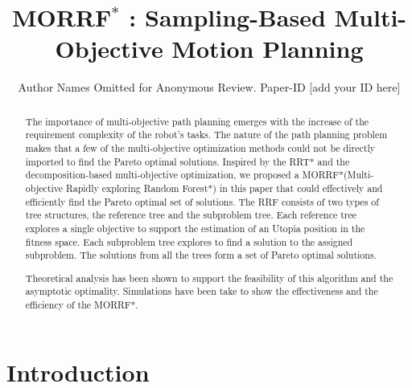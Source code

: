 \documentclass[conference]{IEEEtran}
\theoremstyle{definition}
\begin{document}
\title{ MORRF$^{*}$ : Sampling-Based Multi-Objective Motion Planning }

\author{Author Names Omitted for Anonymous Review. Paper-ID [add your ID here]}

\maketitle

\begin{abstract}
The importance of multi-objective path planning emerges with the increase of the requirement complexity of the robot's tasks.
The nature of the path planning problem makes that a few of the multi-objective optimization methods could not be directly imported to find the Pareto optimal solutions.
Inspired by the RRT* and the decomposition-based multi-objective optimization, we proposed a MORRF*(Multi-objective Rapidly exploring Random Forest*) in this paper that could effectively and efficiently find the Pareto optimal set of solutions.
The RRF consists of two types of tree structures, the reference tree and the subproblem tree.
Each reference tree explores a single objective to support the estimation of an Utopia position in the fitness space.
Each subproblem tree explores to find a solution to the assigned subproblem.
The solutions from all the trees form a set of Pareto optimal solutions. 

Theoretical analysis has been shown to support the feasibility of this algorithm and the asymptotic optimality. 
Simulations have been take to show the effectiveness and the efficiency of the MORRF*.
\end{abstract}

\IEEEpeerreviewmaketitle

\section{Introduction}
\label{sec:intro}
\end{document}
